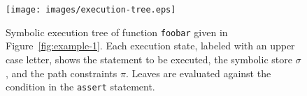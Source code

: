

\begin{figure}[t]
  \centering
  \texttt{[image: images/execution-tree.eps]} 
  \caption{Symbolic execution tree of function {\tt foobar} given in Figure~\ref{fig:example-1}. Each execution state, labeled with an upper case letter, shows the statement to be executed, the symbolic store $\sigma$, and the path constraints $\pi$. Leaves are evaluated against the condition in the {\tt assert} statement. }
  \label{fig:example-symbolic-execution}
  \vspace{-1mm}
\end{figure}

